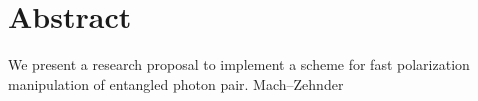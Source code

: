 \chapter*{Abstract}

We present a research proposal to implement a scheme for fast polarization manipulation of entangled photon pair.
	Mach–Zehnder



